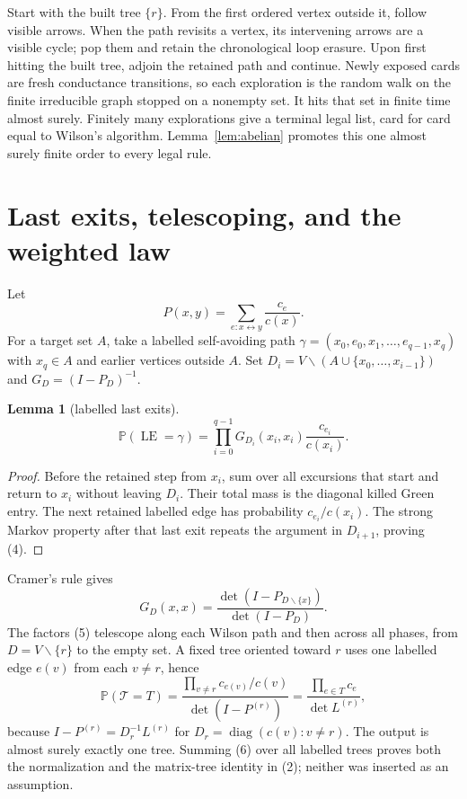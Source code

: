 \documentclass[10pt]{article}
\newtheorem{lemma}{Lemma}
\newcommand{\Prb}{\mathbb P}
\newcommand{\T}{\mathcal T}
\newcommand{\LE}{\operatorname{LE}}
\newcommand{\diag}{\operatorname{diag}}
\begin{document}
Start with the built tree $\{r\}$.  From the first ordered vertex outside it,
follow visible arrows.  When the path revisits a vertex, its intervening
arrows are a visible cycle; pop them and retain the chronological loop
erasure.  Upon first hitting the built tree, adjoin the retained path and
continue.  Newly exposed cards are fresh conductance transitions, so each
exploration is the random walk on the finite irreducible graph stopped on a
nonempty set.  It hits that set in finite time almost surely.  Finitely many
explorations give a terminal legal list, card for card equal to Wilson's
algorithm.  Lemma~\ref{lem:abelian} promotes this one almost surely finite
order to every legal rule.

\section{Last exits, telescoping, and the weighted law}
Let
\[
 P(x,y)=\sum_{e:x\leftrightarrow y}\frac{c_e}{c(x)}.
\]
For a target set $A$, take a labelled self-avoiding path
$\gamma=(x_0,e_0,x_1,\ldots,e_{q-1},x_q)$ with $x_q\in A$ and earlier
vertices outside $A$.  Set
$D_i=V\smallsetminus(A\cup\{x_0,\ldots,x_{i-1}\})$ and
$G_D=(I-P_D)^{-1}$.

\begin{lemma}[labelled last exits]\label{lem:last}
\[
 \Prb(\LE=\gamma)=\prod_{i=0}^{q-1}
 G_{D_i}(x_i,x_i)\frac{c_{e_i}}{c(x_i)}.                     \tag{4}
\]
\end{lemma}
\begin{proof}
Before the retained step from $x_i$, sum over all excursions that start and
return to $x_i$ without leaving $D_i$.  Their total mass is the diagonal
killed Green entry.  The next retained labelled edge has probability
$c_{e_i}/c(x_i)$.  The strong Markov property after that last exit repeats the
argument in $D_{i+1}$, proving (4).
\end{proof}

Cramer's rule gives
\[
G_D(x,x)=\frac{\det(I-P_{D\smallsetminus\{x\}})}{\det(I-P_D)}. \tag{5}
\]
The factors (5) telescope along each Wilson path and then across all phases,
from $D=V\smallsetminus\{r\}$ to the empty set.  A fixed tree oriented toward $r$
uses one labelled edge $e(v)$ from each $v\ne r$, hence
\[
 \Prb(\T=T)=
 \frac{\prod_{v\ne r}c_{e(v)}/c(v)}{\det(I-P^{(r)})}
 =\frac{\prod_{e\in T}c_e}{\det L^{(r)}},                  \tag{6}
\]
because $I-P^{(r)}=D_r^{-1}L^{(r)}$ for
$D_r=\diag(c(v):v\ne r)$.  The output is almost surely exactly one tree.
Summing (6) over all labelled trees proves both the normalization and the
matrix-tree identity in (2); neither was inserted as an assumption.
\end{document}
